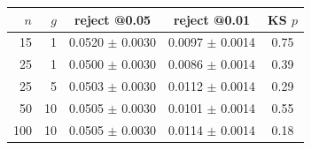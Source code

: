 \begin{tabular}{rrccc}
\toprule
$n$ & $g$ & reject @0.05 & reject @0.01 & KS $p$ \\
\midrule
15 & 1 & 0.0520 $\pm$ 0.0030 & 0.0097 $\pm$ 0.0014 & 0.75 \\
25 & 1 & 0.0500 $\pm$ 0.0030 & 0.0086 $\pm$ 0.0014 & 0.39 \\
25 & 5 & 0.0503 $\pm$ 0.0030 & 0.0112 $\pm$ 0.0014 & 0.29 \\
50 & 10 & 0.0505 $\pm$ 0.0030 & 0.0101 $\pm$ 0.0014 & 0.55 \\
100 & 10 & 0.0505 $\pm$ 0.0030 & 0.0114 $\pm$ 0.0014 & 0.18 \\
\bottomrule
\end{tabular}
